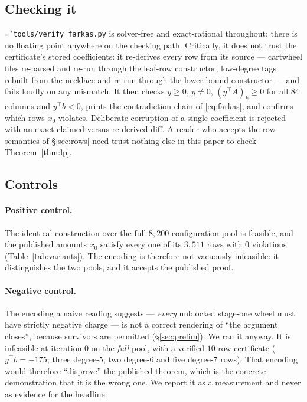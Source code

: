 \documentclass[11pt]{article}
\theoremstyle{definition}
\newcommand{\art}[1]{{\texttt{\hyphenchar\font=`\-\relax #1}}}
\begin{document}
\subsection{Checking it}

\art{tools/verify\_farkas.py} is solver-free and exact-rational throughout; there
is no floating point anywhere on the checking path. Critically, it does not trust
the certificate's stored coefficients: it re-derives every row from its source
--- cartwheel files re-parsed and re-run through the leaf-row constructor,
low-degree tags rebuilt from the necklace and re-run through the lower-bound
constructor --- and fails loudly on any mismatch. It then checks $y \ge 0$,
$y \ne 0$, $(y^\top\!A)_k \ge 0$ for all $84$ columns and $y^\top b < 0$, prints
the contradiction chain of \eqref{eq:farkas}, and confirms which rows $x_0$
violates. Deliberate corruption of a single coefficient is rejected with an exact
claimed-versus-re-derived diff. A reader who accepts the row semantics of
\S\ref{sec:rows} need trust nothing else in this paper to check
Theorem~\ref{thm:lp}.

\subsection{Controls}
\label{sec:controls}

\paragraph{Positive control.} The identical construction over the full
$8{,}200$-configuration pool is feasible, and the published amounts $x_0$ satisfy
every one of its $3{,}511$ rows with $0$ violations (Table~\ref{tab:variants}).
The encoding is therefore not vacuously infeasible: it distinguishes the two
pools, and it accepts the published proof.

\paragraph{Negative control.} The encoding a naive reading suggests ---
\emph{every} unblocked stage-one wheel must have strictly negative charge --- is
not a correct rendering of ``the argument closes'', because survivors are
permitted (\S\ref{sec:prelim}). We ran it anyway. It is infeasible at iteration
$0$ on the \emph{full} pool, with a verified $10$-row certificate
($y^\top b = -175$; three degree-$5$, two degree-$6$ and five degree-$7$ rows).
That encoding would therefore ``disprove'' the published theorem, which is the
concrete demonstration that it is the wrong one. We report it as a measurement
and never as evidence for the headline.
\end{document}
